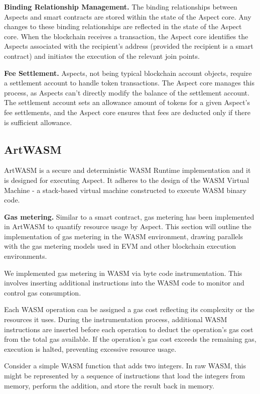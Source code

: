 \textbf{Binding Relationship Management.} The binding relationships between Aspects and smart contracts are stored within the state of the Aspect core. Any changes to these binding relationships are reflected in the state of the Aspect core. When the blockchain receives a transaction, the Aspect core identifies the Aspects associated with the recipient's address (provided the recipient is a smart contract) and initiates the execution of the relevant join points.

\textbf{Fee Settlement.} Aspects, not being typical blockchain account objects, require a settlement account to handle token transactions. The Aspect core manages this process, as Aspects can't directly modify the balance of the settlement account. The settlement account sets an allowance amount of tokens for a given Aspect's fee settlements, and the Aspect core ensures that fees are deducted only if there is sufficient allowance.

\subsection{ArtWASM}

ArtWASM is a secure and deterministic WASM Runtime implementation and it is designed for executing Aspect. It adheres to the design of the WASM Virtual Machine - a stack-based virtual machine constructed to execute WASM binary code.

\textbf{Gas metering.} Similar to a smart contract, gas metering has been implemented in ArtWASM to quantify resource usage by Aspect. This section will outline the implementation of gas metering in the WASM environment, drawing parallels with the gas metering models used in EVM and other blockchain execution environments.

We implemented gas metering in WASM via byte code instrumentation. This involves inserting additional instructions into the WASM code to monitor and control gas consumption.

Each WASM operation can be assigned a gas cost reflecting its complexity or the resources it uses. During the instrumentation process, additional WASM instructions are inserted before each operation to deduct the operation's gas cost from the total gas available. If the operation's gas cost exceeds the remaining gas, execution is halted, preventing excessive resource usage.

Consider a simple WASM function that adds two integers. In raw WASM, this might be represented by a sequence of instructions that load the integers from memory, perform the addition, and store the result back in memory.

